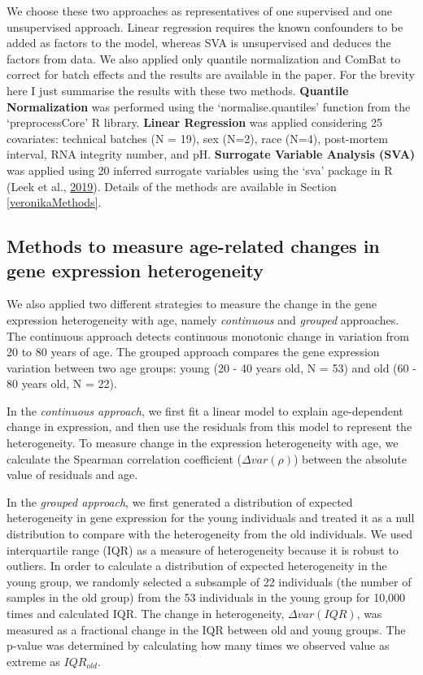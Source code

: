 \documentclass[12pt,twoside]{unicam}
\begin{document}
We choose these two approaches as representatives of one supervised and one unsupervised approach. Linear regression requires the known confounders to be added as factors to the model, whereas SVA is unsupervised and deduces the factors from data. We also applied only quantile normalization and ComBat to correct for batch effects and the results are available in the paper. For the brevity here I just summarise the results with these two methods. \textbf{Quantile Normalization} was performed using the `normalise.quantiles' function from the `preprocessCore' R library. \textbf{Linear Regression} was applied considering 25 covariates: technical batches (N = 19), sex (N=2), race (N=4), post-mortem interval, RNA integrity number, and pH. \textbf{Surrogate Variable Analysis (SVA)} was applied using 20 inferred surrogate variables using the `sva' package in R (Leek et al., \protect\hyperlink{ref-svapack}{2019}). Details of the methods are available in Section \ref{veronikaMethods}.

\hypertarget{methods-to-measure-age-related-changes-in-gene-expression-heterogeneity}{%
\subsection{Methods to measure age-related changes in gene expression heterogeneity}\label{methods-to-measure-age-related-changes-in-gene-expression-heterogeneity}}

We also applied two different strategies to measure the change in the gene expression heterogeneity with age, namely \emph{continuous} and \emph{grouped} approaches. The continuous approach detects continuous monotonic change in variation from 20 to 80 years of age. The grouped approach compares the gene expression variation between two age groups: young (20 - 40 years old, N = 53) and old (60 - 80 years old, N = 22).

In the \emph{continuous approach}, we first fit a linear model to explain age-dependent change in expression, and then use the residuals from this model to represent the heterogeneity. To measure change in the expression heterogeneity with age, we calculate the Spearman correlation coefficient (\(\Delta var (\rho)\)) between the absolute value of residuals and age.

In the \emph{grouped approach}, we first generated a distribution of expected heterogeneity in gene expression for the young individuals and treated it as a null distribution to compare with the heterogeneity from the old individuals. We used interquartile range (IQR) as a measure of heterogeneity because it is robust to outliers. In order to calculate a distribution of expected heterogeneity in the young group, we randomly selected a subsample of 22 individuals (the number of samples in the old group) from the 53 individuals in the young group for 10,000 times and calculated IQR. The change in heterogeneity, \(\Delta var(IQR)\), was measured as a fractional change in the IQR between old and young groups. The p-value was determined by calculating how many times we observed value as extreme as \(IQR_{old}\).
\end{document}
